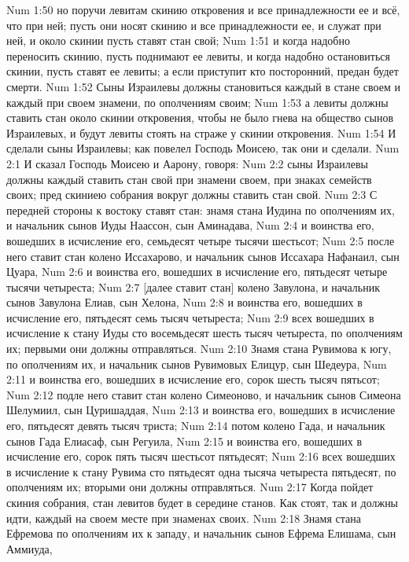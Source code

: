 \vs Num 1:50 но поручи левитам скинию откровения и все принадлежности ее и всё, что при ней; пусть они носят скинию и все принадлежности ее, и служат при ней, и около скинии пусть ставят стан свой;
\vs Num 1:51 и когда надобно переносить скинию, пусть поднимают ее левиты, и когда надобно остановиться скинии, пусть ставят ее левиты; а если приступит кто посторонний, предан будет смерти.
\vs Num 1:52 Сыны Израилевы должны становиться каждый в стане своем и каждый при своем знамени, по ополчениям своим;
\vs Num 1:53 а левиты должны ставить стан около скинии откровения, чтобы не было гнева на общество сынов Израилевых, и будут левиты стоять на страже у скинии откровения.
\vs Num 1:54 И сделали сыны Израилевы; как повелел Господь Моисею, так они и сделали.
\vs Num 2:1 И сказал Господь Моисею и Аарону, говоря:
\vs Num 2:2 сыны Израилевы должны каждый ставить стан свой при знамени своем, при знаках семейств своих; пред скиниею собрания вокруг должны ставить стан свой.
\vs Num 2:3 С передней стороны к востоку ставят стан: знамя стана Иудина по ополчениям их, и начальник сынов Иуды Наассон, сын Аминадава,
\vs Num 2:4 и воинства его, вошедших в исчисление его, семьдесят четыре тысячи шестьсот;
\vs Num 2:5 после него ставит стан колено Иссахарово, и начальник сынов Иссахара Нафанаил, сын Цуара,
\vs Num 2:6 и воинства его, вошедших в исчисление его, пятьдесят четыре тысячи четыреста;
\vs Num 2:7 [далее ставит стан] колено Завулона, и начальник сынов Завулона Елиав, сын Хелона,
\vs Num 2:8 и воинства его, вошедших в исчисление его, пятьдесят семь тысяч четыреста;
\vs Num 2:9 всех вошедших в исчисление к стану Иуды сто восемьдесят шесть тысяч четыреста, по ополчениям их; первыми они должны отправляться.
\vs Num 2:10 Знамя стана Рувимова к югу, по ополчениям их, и начальник сынов Рувимовых Елицур, сын Шедеура,
\vs Num 2:11 и воинства его, вошедших в исчисление его, сорок шесть тысяч пятьсот;
\vs Num 2:12 подле него ставит стан колено Симеоново, и начальник сынов Симеона Шелумиил, сын Цуришаддая,
\vs Num 2:13 и воинства его, вошедших в исчисление его, пятьдесят девять тысяч триста;
\vs Num 2:14 потом колено Гада, и начальник сынов Гада Елиасаф, сын Регуила,
\vs Num 2:15 и воинства его, вошедших в исчисление его, сорок пять тысяч шестьсот пятьдесят;
\vs Num 2:16 всех вошедших в исчисление к стану Рувима сто пятьдесят одна тысяча четыреста пятьдесят, по ополчениям их; вторыми они должны отправляться.
\vs Num 2:17 Когда пойдет скиния собрания, стан левитов будет в середине станов. Как стоят, так и должны идти, каждый на своем месте при знаменах своих.
\vs Num 2:18 Знамя стана Ефремова по ополчениям их к западу, и начальник сынов Ефрема Елишама, сын Аммиуда,
